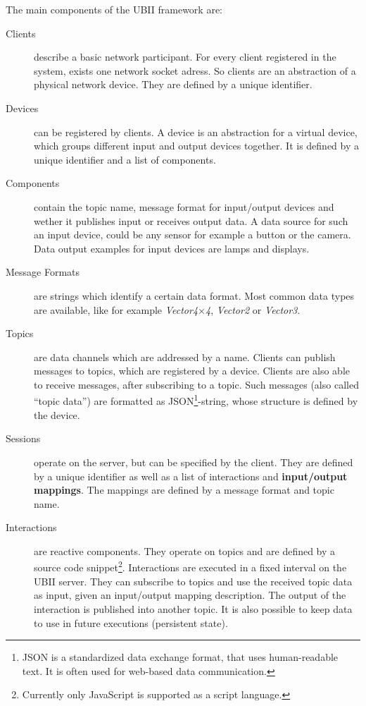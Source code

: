 The main components of the \ac{UBII} framework are:
\begin{description}
	\item[Clients] describe a basic network participant. For every client registered in the system, exists one network socket adress. So clients are an abstraction of a physical network device. They are defined by a unique identifier. 
	\item[Devices] can be registered by clients. A device is an abstraction for a virtual device, which groups different input and output devices together. It is defined by a unique identifier and a list of components.
  \item[Components] contain the topic name, message format for input/output devices and wether it publishes input or receives output data. A data source for such an input device, could be any sensor for example a button or the camera. Data output examples for input devices are lamps and displays.
  \item[Message Formats] are strings which identify a certain data format. Most common data types are available, like for example \textit{Vector4\( \times \)4}, \textit{Vector2} or \textit{Vector3}.
	\item[Topics] are data channels which are addressed by a name. Clients can publish messages to topics, which are registered by a device. Clients are also able to receive messages, after subscribing to a topic. Such messages (also called \enquote{topic data}) are formatted as JSON\footnote{JSON is a standardized data exchange format, that uses human-readable text. It is often used for web-based data communication.}-string, whose structure is defined by the device.
	\item[Sessions] operate on the server, but can be specified by the client. They are defined by a unique identifier as well as a list of interactions and \textbf{input/output mappings}. The mappings are defined by a message format and topic name.
	\item[Interactions] are reactive components. They operate on topics and are defined by a source code snippet\footnote{Currently only JavaScript is supported as a script language.}. Interactions are executed in a fixed interval on the \ac{UBII} server. They can subscribe to topics and use the received topic data as input, given an input/output mapping description. The output of the interaction is published into another topic. It is also possible to keep data to use in future executions (persistent state).
\end{description}

